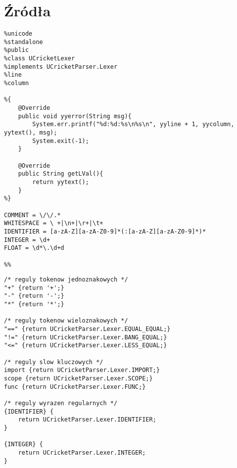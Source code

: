 \chapter{Źródła}
\begin{lstlisting}[caption={Sekcja konfiguracyjna narzędzia JFlex}, label={lst:lexer-konfiguracja}]
%%
%unicode
%standalone
%public
%class UCricketLexer
%implements UCricketParser.Lexer
%line
%column

%{
    @Override
    public void yyerror(String msg){
        System.err.printf("%d:%d:%s\n%s\n", yyline + 1, yycolumn, yytext(), msg);
        System.exit(-1);
    }

    @Override
    public String getLVal(){
        return yytext();
    }
%}

COMMENT = \/\/.*
WHITESPACE = \ +|\n+|\r+|\t+
IDENTIFIER = [a-zA-Z][a-zA-Z0-9]*(:[a-zA-Z][a-zA-Z0-9]*)*
INTEGER = \d+
FLOAT = \d*\.\d+d

%%
\end{lstlisting}

\begin{lstlisting}[caption={Definicje reguł analizatora leksykalnego}, label={lst:lexer-reguły}]
/* reguly tokenow jednoznakowych */
"+" {return '+';}
"-" {return '-';}
"*" {return '*';}

/* reguly tokenow wieloznakowych */
"==" {return UCricketParser.Lexer.EQUAL_EQUAL;}
"!=" {return UCricketParser.Lexer.BANG_EQUAL;}
"<=" {return UCricketParser.Lexer.LESS_EQUAL;} 

/* reguly slow kluczowych */
import {return UCricketParser.Lexer.IMPORT;}
scope {return UCricketParser.Lexer.SCOPE;}
func {return UCricketParser.Lexer.FUNC;}

/* reguly wyrazen regularnych */
{IDENTIFIER} {
    return UCricketParser.Lexer.IDENTIFIER;
}

{INTEGER} {
    return UCricketParser.Lexer.INTEGER;
}
\end{lstlisting}



